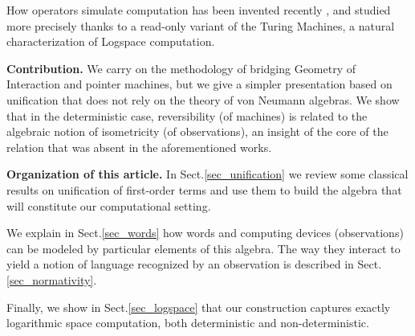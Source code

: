 How operators simulate computation has been invented recently \cite{girard_normativity_2012}, and studied more precisely \cite{aubert_characterizing_2012,seiller_logarithmic_2013} thanks to a read-only variant of the Turing Machines, a natural characterization of {\sc Logspace} computation.



\bigskip\noindent
\textbf{Contribution.} We carry on the methodology of bridging Geometry of Interaction and pointer machines, but we give a simpler presentation based on unification that does not rely on the theory of von Neumann algebras.
We show that in the deterministic case, reversibility (of machines) is related to the algebraic notion of isometricity (of observations), an insight of the core of the relation that was absent in the aforementioned works.


\medskip\noindent
\textbf{Organization of this article.} In Sect.\ref{sec_unification} we review some classical results on unification of first-order terms and use them to build the algebra that will constitute our computational setting.

We explain in Sect.\ref{sec_words} how words and computing devices (observations) can be modeled by particular elements of this algebra.
The way they interact to yield a notion of language recognized by an observation is described in Sect.\ref{sec_normativity}.

Finally, we show in Sect.\ref{sec_logspace} that our construction captures exactly logarithmic space computation, both deterministic and non-deterministic.
